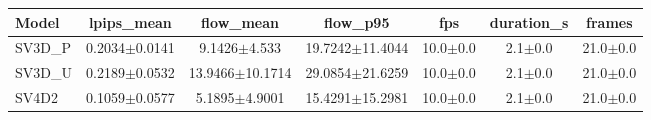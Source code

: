 \begin{tabular}{lcccccc}
\toprule
Model & lpips_mean & flow_mean & flow_p95 & fps & duration_s & frames \\
\midrule
SV3D_P & 0.2034$\pm$0.0141 & 9.1426$\pm$4.533 & 19.7242$\pm$11.4044 & 10.0$\pm$0.0 & 2.1$\pm$0.0 & 21.0$\pm$0.0 \\
SV3D_U & 0.2189$\pm$0.0532 & 13.9466$\pm$10.1714 & 29.0854$\pm$21.6259 & 10.0$\pm$0.0 & 2.1$\pm$0.0 & 21.0$\pm$0.0 \\
SV4D2 & 0.1059$\pm$0.0577 & 5.1895$\pm$4.9001 & 15.4291$\pm$15.2981 & 10.0$\pm$0.0 & 2.1$\pm$0.0 & 21.0$\pm$0.0 \\
\bottomrule
\end{tabular}